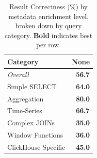 \begin{table}[t]
\centering
\caption{Result Correctness (\%) by metadata enrichment level, broken down by query category. \textbf{Bold} indicates best per row.}
\label{tab:metadata_enrichment}
\small
\begin{tabular}{lr}
\toprule
Category & None \\
\midrule
\textit{Overall} & \textbf{56.7} \\
\midrule
Simple SELECT & \textbf{64.0} \\
Aggregation & \textbf{80.0} \\
Time-Series & \textbf{66.7} \\
Complex JOINs & \textbf{35.0} \\
Window Functions & \textbf{36.0} \\
ClickHouse-Specific & \textbf{45.0} \\
\bottomrule
\end{tabular}
\end{table}